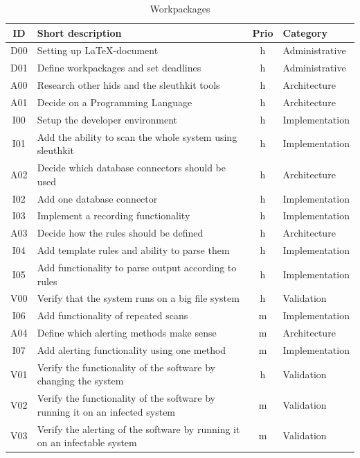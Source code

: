 \documentclass[
	a4paper,					%
	10pt,							%
	twoside,					%
	openright,				%
	notitlepage,			%
	parskip=half,			%
]{scrreprt}					%
\begin{document}
\begin{table}[h!]
  \begin{center}
    \caption{Workpackages}
    \label{tab:workpackages}
    \begin{tabular}{c|l|c|l}
      \textbf{ID} & \textbf{Short description} & \textbf{Prio} & \textbf{Category} \\
      \hline
      D00 & Setting up \LaTeX -document & h & Administrative \\
      D01 & Define workpackages and set deadlines & h & Administrative \\
			A00 & Research other \gls{hids} and the sleuthkit tools & h & Architecture \\
			A01 & Decide on a Programming Language & h & Architecture \\
			I00 & Setup the developer environment & h & Implementation \\
			I01 & Add the ability to scan the whole system using sleuthkit & h & Implementation \\
			A02 & Decide which database connectors should be used & h & Architecture \\
			I02 & Add one database connector & h & Implementation \\
			I03 & Implement a recording functionality & h & Implementation \\
			A03 & Decide how the rules should be defined & h & Architecture \\
			I04 & Add template rules and ability to parse them & h & Implementation \\
			I05 & Add functionality to parse output according to rules & h & Implementation \\
			V00 & Verify that the system runs on a big file system & h & Validation \\
			I06 & Add functionality of repeated scans & m & Implementation \\
			A04 & Define which alerting methods make sense & m & Architecture \\ 
			I07 & Add alerting functionality using one method & m & Implementation \\
			V01 & Verify the functionality of the software by changing the system & h & Validation \\
			V02 & Verify the functionality of the software by running it on an infected system & m & Validation \\
			V03 & Verify the alerting of the software by running it on an infectable system & m & Validation \\

\end{tabular}
\end{center}
\end{table}
\end{document}
